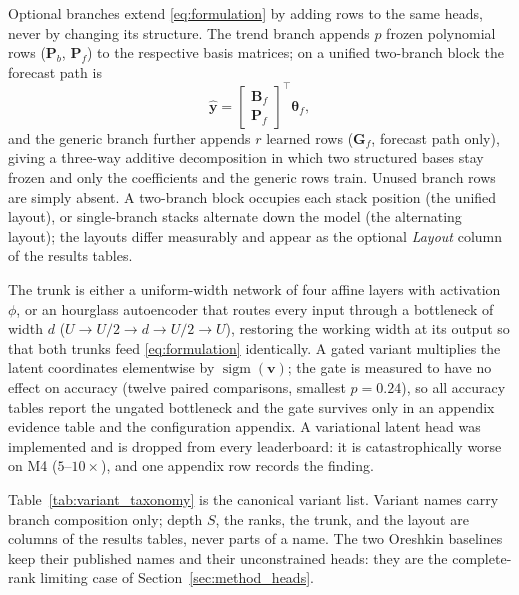 Optional branches extend \eqref{eq:formulation} by adding rows to the same
heads, never by changing its structure. The trend branch appends $p$ frozen
polynomial rows ($\mathbf{P}_b$, $\mathbf{P}_f$) to the respective basis
matrices; on a unified two-branch block the forecast path is
\begin{equation}
\label{eq:composition}
\hat{\mathbf{y}}
=\begin{bmatrix}\mathbf{B}_f\\ \mathbf{P}_f\end{bmatrix}^{\!\top}
 \boldsymbol{\theta}_f ,
\end{equation}
and the generic branch further appends $r$ learned rows
($\mathbf{G}_f$, forecast path only), giving a three-way additive
decomposition in which two structured bases stay frozen and only the
coefficients and the generic rows train. Unused branch rows are simply
absent. A two-branch block occupies each stack position (the unified layout),
or single-branch stacks alternate down the model (the alternating layout);
the layouts differ measurably and appear as the optional \emph{Layout} column
of the results tables.

The trunk is either a uniform-width network of four affine layers with
activation $\phi$, or an hourglass autoencoder that routes every input
through a bottleneck of width $d$
($U \rightarrow U/2 \rightarrow d \rightarrow U/2 \rightarrow U$), restoring
the working width at its output so that both trunks feed
\eqref{eq:formulation} identically. A gated variant multiplies the latent
coordinates elementwise by $\operatorname{sigm}(\mathbf{v})$; the gate is
measured to have no effect on accuracy (twelve paired comparisons, smallest
$p = 0.24$), so all accuracy tables report the ungated bottleneck and the
gate survives only in an appendix evidence table and the configuration
appendix. A variational latent head was implemented and is dropped from every
leaderboard: it is catastrophically worse on M4 ($5$--$10\times$), and one
appendix row records the finding.

Table~\ref{tab:variant_taxonomy} is the canonical variant list. Variant names
carry branch composition only; depth $S$, the ranks, the trunk, and the
layout are columns of the results tables, never parts of a name. The two
Oreshkin baselines keep their published names and their unconstrained heads:
they are the complete-rank limiting case of
Section~\ref{sec:method_heads}.


